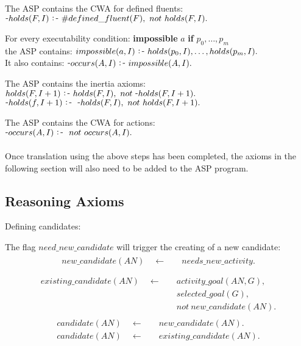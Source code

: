 \documentclass[11pt, oneside]{article}
\def\-{\raisebox{.75pt}{-}}
\def\:-{\raisebox{.75pt}{\ :\,-\ }}
\begin{document}
The ASP contains the CWA for defined fluents:\\
$\-holds(F, I) \:- \#defined\_fluent(F),\ not\  holds(F, I).$\par

For every executability condition: \textbf{impossible} $a$ \textbf{if} $p_0, \dots, p_m$\\
the ASP contains: $impossible(a, I) \:- holds(p_0, I), \dots, holds(p_m, I).$\\
It also contains: $\-occurs(A, I) \:- impossible(A, I).$\par

The ASP contains the inertia axioms:\\
$holds(F, I+1) \:- holds(F, I),\ not\  \-holds(F, I+1).$\\

$\-holds(f, I+1) \:-\ \-holds(F, I),\ not\  holds(F, I+1).$\par

The ASP contains the CWA for actions:\\
$\-occurs(A, I) \:-\ not\  occurs(A, I).$\\
\\
Once translation using the above steps has been completed, the axioms in the following section will also need to be added to the ASP program.


\subsection{Reasoning Axioms}
Defining candidates:

The flag $need\_new\_candidate$ will trigger the creating of a new candidate:
\begin{align}\begin{split}
new\_candidate(AN) \quad \leftarrow \quad 
&needs\_new\_activity.\\
\end{split}\end{align}
\begin{align}\begin{split}
existing\_candidate(AN) \quad \leftarrow \quad 
&activity\_goal(AN,G),\\
&selected\_goal(G),\\
&not\ new\_candidate(AN).
\end{split}\end{align}
\begin{align}\begin{split}
candidate(AN) \quad \leftarrow \quad 
&new\_candidate(AN).\\
candidate(AN) \quad \leftarrow \quad 
&existing\_candidate(AN).
\end{split}\end{align}
\end{document}
